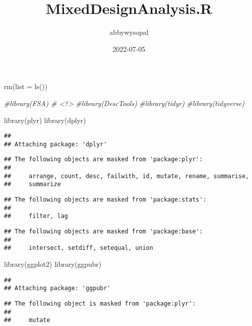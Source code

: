 \documentclass[
]{article}
\title{MixedDesignAnalysis.R}
\author{abbywysopal}
\date{2022-07-05}
\newenvironment{Shaded}{\begin{snugshade}}{\end{snugshade}}
\newcommand{\AttributeTok}[1]{\textcolor[rgb]{0.77,0.63,0.00}{#1}}
\newcommand{\CommentTok}[1]{\textcolor[rgb]{0.56,0.35,0.01}{\textit{#1}}}
\newcommand{\FunctionTok}[1]{\textcolor[rgb]{0.00,0.00,0.00}{#1}}
\newcommand{\NormalTok}[1]{#1}
\begin{document}
\maketitle

\begin{Shaded}
\begin{Highlighting}[]
\FunctionTok{rm}\NormalTok{(}\AttributeTok{list =} \FunctionTok{ls}\NormalTok{())}

\CommentTok{\#library(FSA) \# \textless{}?\textgreater{}}
\CommentTok{\#library(DescTools)}
\CommentTok{\#library(tidyr)}
\CommentTok{\#library(tidyverse)}

\FunctionTok{library}\NormalTok{(plyr)}
\FunctionTok{library}\NormalTok{(dplyr)}
\end{Highlighting}
\end{Shaded}

\begin{verbatim}
## 
## Attaching package: 'dplyr'
\end{verbatim}

\begin{verbatim}
## The following objects are masked from 'package:plyr':
## 
##     arrange, count, desc, failwith, id, mutate, rename, summarise,
##     summarize
\end{verbatim}

\begin{verbatim}
## The following objects are masked from 'package:stats':
## 
##     filter, lag
\end{verbatim}

\begin{verbatim}
## The following objects are masked from 'package:base':
## 
##     intersect, setdiff, setequal, union
\end{verbatim}

\begin{Shaded}
\begin{Highlighting}[]
\FunctionTok{library}\NormalTok{(ggplot2)}
\FunctionTok{library}\NormalTok{(ggpubr)}
\end{Highlighting}
\end{Shaded}

\begin{verbatim}
## 
## Attaching package: 'ggpubr'
\end{verbatim}

\begin{verbatim}
## The following object is masked from 'package:plyr':
## 
##     mutate
\end{verbatim}
\end{document}
